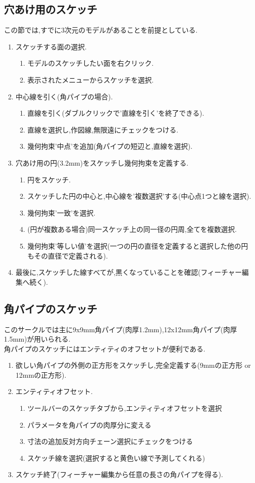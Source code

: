 \documentclass[a4paper,11pt]{jsarticle}
\begin{document}
\subsection{穴あけ用のスケッチ}
この節では,すでに3次元のモデルがあることを前提としている.
\begin{enumerate}
 \item スケッチする面の選択.
 \begin{enumerate}
  \item モデルのスケッチしたい面を右クリック.
  \item 表示されたメニューからスケッチを選択.
 \end{enumerate}
\item 中心線を引く(角パイプの場合).
\begin{enumerate}
 \item 直線を引く(ダブルクリックで'直線を引く'を終了できる).
 \item 直線を選択し,作図線,無限遠にチェックをつける.
 \item 幾何拘束'中点'を追加(角パイプの短辺と,直線を選択).
\end{enumerate}
 \item 穴あけ用の円(3.2mm)をスケッチし幾何拘束を定義する.
 \begin{enumerate}
  \item 円をスケッチ.
  \item スケッチした円の中心と,中心線を'複数選択'する(中心点1つと線を選択).
  \item 幾何拘束'一致'を選択.
  \item (円が複数ある場合)同一スケッチ上の同一径の円周,全てを複数選択.
  \item 幾何拘束'等しい値'を選択(一つの円の直径を定義すると選択した他の円もその直径で定義される).
 \end{enumerate}
\item 最後に,スケッチした線すべてが,黒くなっていることを確認(フィーチャー編集へ続く).
\end{enumerate}
\subsection{角パイプのスケッチ}
このサークルでは主に9x9mm角パイプ(肉厚1.2mm),12x12mm角パイプ(肉厚1.5mm)が用いられる.\\
角パイプのスケッチにはエンティティのオフセットが便利である.
\begin{enumerate}
 \item 欲しい角パイプの外側の正方形をスケッチし,完全定義する(9mmの正方形 or 12mmの正方形).
 \item エンティティオフセット.
 \begin{enumerate}
  \item ツールバーのスケッチタブから,エンティティオフセットを選択
  \item パラメータを角パイプの肉厚分に変える
  \item 寸法の追加反対方向チェーン選択にチェックをつける
  \item スケッチ線を選択(選択すると黄色い線で予測してくれる)
 \end{enumerate}
 \item スケッチ終了(フィーチャー編集から任意の長さの角パイプを得る).
\end{enumerate}
\end{document}
